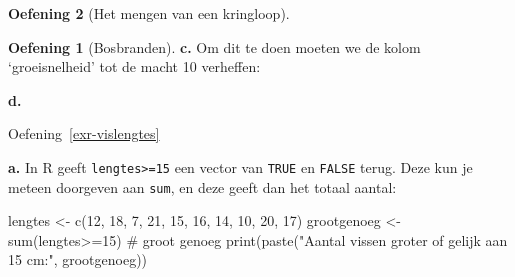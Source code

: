 \documentclass[
  a4paper,
]{scrbook}
\newenvironment{Shaded}{\begin{snugshade}}{\end{snugshade}}
\newcommand{\AttributeTok}[1]{\textcolor[rgb]{0.40,0.45,0.13}{#1}}
\newcommand{\CommentTok}[1]{\textcolor[rgb]{0.37,0.37,0.37}{#1}}
\newcommand{\DecValTok}[1]{\textcolor[rgb]{0.68,0.00,0.00}{#1}}
\newcommand{\FunctionTok}[1]{\textcolor[rgb]{0.28,0.35,0.67}{#1}}
\newcommand{\NormalTok}[1]{\textcolor[rgb]{0.00,0.23,0.31}{#1}}
\newcommand{\OtherTok}[1]{\textcolor[rgb]{0.00,0.23,0.31}{#1}}
\newcommand{\SpecialCharTok}[1]{\textcolor[rgb]{0.37,0.37,0.37}{#1}}
\newcommand{\StringTok}[1]{\textcolor[rgb]{0.13,0.47,0.30}{#1}}
\theoremstyle{definition}
\newtheorem{exercise}{Oefening}[chapter]
\theoremstyle{remark}
\begin{document}
\begin{exercise}[Het mengen van een
kringloop]
\begin{exercise}[Bosbranden]
\textbf{c.} Om dit te doen moeten we de kolom `groeisnelheid' tot de
macht 10 verheffen:

\begin{Shaded}
\end{Shaded}

\textbf{d.}

\begin{Shaded}
\end{Shaded}

Oefening~\ref{exr-vislengtes}

\textbf{a.} In R geeft \texttt{lengtes\textgreater{}=15} een vector van
\texttt{TRUE} en \texttt{FALSE} terug. Deze kun je meteen doorgeven aan
\texttt{sum}, en deze geeft dan het totaal aantal:

\begin{Shaded}
\begin{Highlighting}[]
\NormalTok{lengtes }\OtherTok{\textless{}{-}} \FunctionTok{c}\NormalTok{(}\DecValTok{12}\NormalTok{, }\DecValTok{18}\NormalTok{, }\DecValTok{7}\NormalTok{, }\DecValTok{21}\NormalTok{, }\DecValTok{15}\NormalTok{, }\DecValTok{16}\NormalTok{, }\DecValTok{14}\NormalTok{, }\DecValTok{10}\NormalTok{, }\DecValTok{20}\NormalTok{, }\DecValTok{17}\NormalTok{)}
\NormalTok{grootgenoeg }\OtherTok{\textless{}{-}} \FunctionTok{sum}\NormalTok{(lengtes}\SpecialCharTok{\textgreater{}=}\DecValTok{15}\NormalTok{) }\CommentTok{\# groot genoeg}
\FunctionTok{print}\NormalTok{(}\FunctionTok{paste}\NormalTok{(}\StringTok{"Aantal vissen groter of gelijk aan 15 cm:"}\NormalTok{, grootgenoeg))}
\end{Highlighting}
\end{Shaded}


\end{exercise}
\end{exercise}
\end{document}
